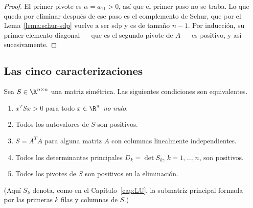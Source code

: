 \begin{proof}
El primer pivote es $\alpha=a_{11}>0$, así que el primer paso no se traba. Lo
que queda por eliminar después de ese paso es el complemento de Schur, que por
el Lema~\ref{lema:schur-sdp} vuelve a ser sdp y es de tamaño $n-1$. Por
inducción, su primer elemento diagonal --- que es el segundo pivote de $A$ ---
es positivo, y así sucesivamente.
\end{proof}

\subsection{Las cinco caracterizaciones}

\begin{theorem}\label{teo:equiv-sdp}
    Sea $S\in\R^{n\times n}$ una matriz simétrica. Las siguientes condiciones
    son equivalentes.
    \begin{enumerate}[label=\textbf{(\alph*)}]
        \item\label{item-TeoEquivSDP-a} $x^TSx>0$ para todo
          $x\in\R^n$ \emph{no nulo}.
        \item\label{item-TeoEquivSDP-b} Todos los autovalores de $S$ son positivos.
        \item\label{item-TeoEquivSDP-c} $S = A^TA$ para alguna matriz $A$ con
          columnas linealmente independientes.
        \item\label{item-TeoEquivSDP-d} Todos los determinantes principales
          $D_k=\det S_k$, $k=1,\dots,n$, son positivos.
        \item\label{item-TeoEquivSDP-e} Todos los pivotes de $S$ son positivos
          en la eliminación.
    \end{enumerate}
    (Aquí $S_k$ denota, como en el Capítulo~\ref{cap:LU}, la submatriz
    principal formada por las primeras $k$ filas y columnas de $S$.)
\end{theorem}

